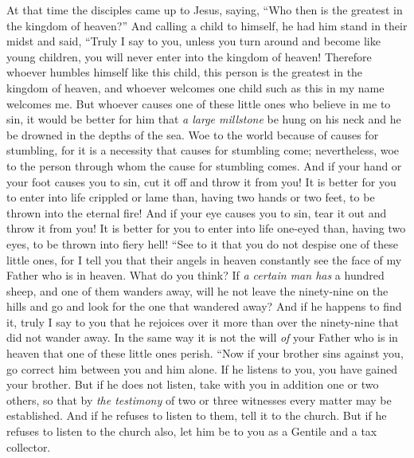 \begin{biblechapter} %
 At that time the disciples came up to Jesus, saying, “Who then is the greatest in the kingdom of heaven?”
\verse And calling a child to himself, he had him stand in their midst
\verse and said, “Truly I say to you, unless you turn around and become like young children, you will never enter into the kingdom of heaven!
\verse Therefore whoever humbles himself like this child, this person is the greatest in the kingdom of heaven,
\verse and whoever welcomes one child such as this in my name welcomes me.
\verse But whoever causes one of these little ones who believe in me to sin, it would be better for him that \textit{a large millstone} be hung on his neck and he be drowned in the depths of the sea.
\verse Woe to the world because of causes for stumbling, for it is a necessity that causes for stumbling come; nevertheless, woe to the person through whom the cause for stumbling comes.
\verse And if your hand or your foot causes you to sin, cut it off and throw it from you! It is better for you to enter into life crippled or lame than, having two hands or two feet, to be thrown into the eternal fire!
\verse And if your eye causes you to sin, tear it out and throw it from you! It is better for you to enter into life one-eyed than, having two eyes, to be thrown into fiery hell!
 “See to it that you do not despise one of these little ones, for I tell you that their angels in heaven constantly see the face of my Father who is in heaven.
\verse What do you think? If \textit{a certain man has} a hundred sheep, and one of them wanders away, will he not leave the ninety-nine on the hills and go and look for the one that wandered away?
\verse And if he happens to find it, truly I say to you that he rejoices over it more than over the ninety-nine that did not wander away.
\verse In the same way it is not the will \textit{of} your Father who is in heaven that one of these little ones perish.
 “Now if your brother sins against you, go correct him between you and him alone. If he listens to you, you have gained your brother.
\verse But if he does not listen, take with you in addition one or two others, so that by \textit{the testimony} of two or three witnesses every matter may be established.
\verse And if he refuses to listen to them, tell it to the church. But if he refuses to listen to the church also, let him be to you as a Gentile and a tax collector.

\end{biblechapter}
